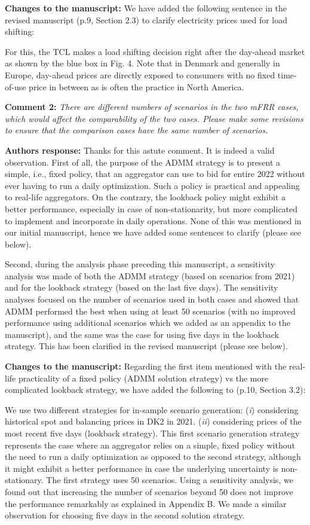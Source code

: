 \documentclass[10pt]{article}
\newcommand{\nt}[1]{\textcolor{newtextcolor}{#1}}
\newcommand{\auth}{\textbf{Authors response: }}
\newcommand{\changes}{\textbf{Changes to the manuscript: }}
\begin{document}
\changes We have added the following sentence in the revised manuscript (p.9, Section 2.3) to clarify electricity prices used for load shifting:

\nt{For this, the TCL makes a load shifting decision right after the day-ahead market as shown by the blue box in Fig. 4. Note that in Denmark and generally in Europe, day-ahead prices are directly exposed to consumers with no fixed time-of-use price in between as is often the practice in North America.}

\textbf{Comment 2:} \textit{There are different numbers of scenarios in the two mFRR cases, which would affect the comparability of the two cases. Please make some revisions to ensure that the comparison cases have the same number of scenarios.}

\auth Thanks for this astute comment. It is indeed a valid observation. First of all, the purpose of the ADMM strategy is to present a simple, i.e., fixed policy, that an aggregator can use to bid for entire 2022 without ever having to run a daily optimization. Such a policy is practical and appealing to real-life aggregators. On the contrary, the lookback policy might exhibit a better performance, especially in case of non-stationarity, but more complicated to implement and incorporate in daily operations. None of this was mentioned in our initial manuscript, hence we have added some sentences to clarify (please see below).

Second, during the analysis phase preceding this manuscript, a sensitivity analysis was made of both the ADMM strategy (based on scenarios from 2021) and for the lookback strategy (based on the last five days). The sensitivity analyses focused on the number of scenarios used in both cases and showed that ADMM performed the best when using at least 50 scenarios (with no improved performance using additional scenarios which we added as an appendix to the manuscript), and the same was the case for using five days in the lookback strategy. This has been clarified in the revised manuscript (please see below).

\changes Regarding the first item mentioned with the real-life practicality of a fixed policy (ADMM solution strategy) vs the more complicated lookback strategy, we have added the following to (p.10, Section 3.2):

\nt{We use two different strategies for in-sample scenario generation: (\textit{i}) considering historical spot and balancing prices in DK2 in 2021.
(\textit{ii}) considering prices of the most recent five days (lookback strategy). This first scenario generation strategy represents the case where an aggregator relies on a simple, fixed policy without the need to run a daily optimization as opposed to the second  strategy, although it might exhibit a better performance in case the underlying uncertainty is non-stationary. The first  strategy uses 50 scenarios. Using a sensitivity analysis, we found out that increasing the number of scenarios beyond 50 does not improve the performance remarkably as explained in Appendix B. We made a similar observation for choosing five days in the second solution strategy.}
\end{document}
